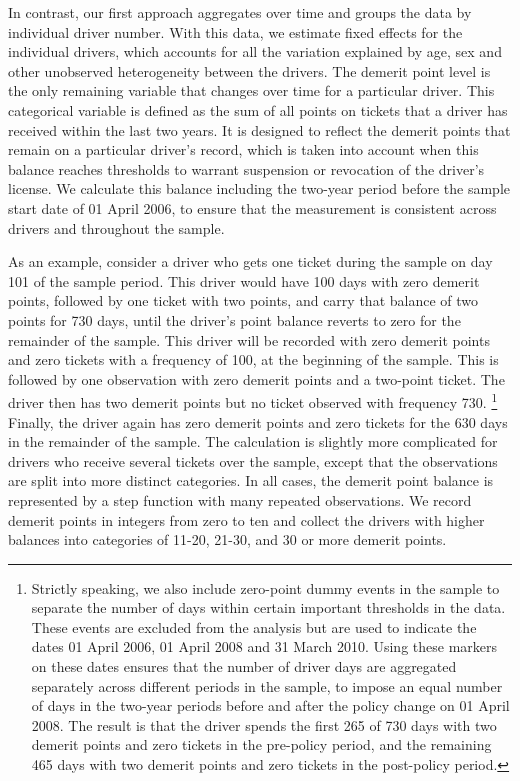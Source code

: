 \documentclass[12pt]{paper}
\begin{document}
In contrast, our first approach aggregates over time and groups the data by individual driver number. 
With this data, we estimate fixed effects for the individual drivers, which accounts for all the variation explained by age, sex and other unobserved heterogeneity between the drivers.
The demerit point level is the only remaining variable that changes over time for a particular driver. 
% 
This categorical variable is defined as the sum of all points on tickets that a driver has received within the last two years. 
It is designed to reflect the demerit points that remain on a particular driver's record, 
which is taken into account when this balance reaches thresholds to warrant suspension or revocation of the driver's license. 
We calculate this balance including the two-year period before the sample start date of 01 April 2006, to ensure that the measurement is consistent across drivers and throughout the sample. 



As an example, consider a driver who gets one ticket during the sample on day 101 of the sample period. 
This driver would have 100 days with zero demerit points, 
followed by one ticket with two points, 
and carry that balance of two points for 730 days, 
until the driver's point balance reverts to zero for the remainder of the sample. 
This driver will be recorded with zero demerit points and zero tickets with a frequency of 100, 
at the beginning of the sample. 
This is followed by one observation with zero demerit points and a two-point ticket. 
The driver then has two demerit points but no ticket observed with frequency 730.%
%
\footnote{Strictly speaking, we also include zero-point dummy events in the sample
to separate the number of days within certain important thresholds in the data. 
These events are excluded from the analysis but are used to indicate 
the dates 01 April 2006, 01 April 2008 and 31 March 2010. 
Using these markers on these dates ensures that the number of driver days are aggregated separately across 
different periods in the sample, to impose an equal number of days in the two-year periods before and after the policy change on 01 April 2008. 
The result is that the driver spends the first 265 of 730 days with two demerit points and zero tickets in the pre-policy period, 
and the remaining 465 days with two demerit points and zero tickets in the post-policy period.} 
% 
Finally, the driver again has zero demerit points and zero tickets for the 630 days in the remainder of the sample.
%
The calculation is slightly more complicated for drivers who receive several tickets over the sample, 
except that the observations are split into more distinct categories. 
In all cases, the demerit point balance is represented by a step function with many repeated observations. 
We record demerit points in integers from zero to ten and collect the drivers with higher balances
into categories of 11-20, 21-30, and 30 or more demerit points. 
\end{document}
